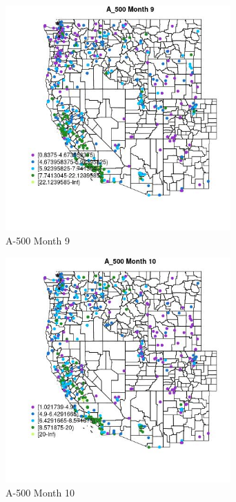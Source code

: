 \begin{figure} 
\centering  
\includegraphics[width=0.77\textwidth]{Code_Outputs/ML_input_report_ML_input_PM25_Step5_part_d_de_duplicated_aves_ML_input_MapObsMo9A_500.jpg} 
\caption{\label{fig:ML_input_report_ML_input_PM25_Step5_part_d_de_duplicated_aves_ML_inputMapObsMo9A_500}A-500 Month 9} 
\end{figure} 
 

\begin{figure} 
\centering  
\includegraphics[width=0.77\textwidth]{Code_Outputs/ML_input_report_ML_input_PM25_Step5_part_d_de_duplicated_aves_ML_input_MapObsMo10A_500.jpg} 
\caption{\label{fig:ML_input_report_ML_input_PM25_Step5_part_d_de_duplicated_aves_ML_inputMapObsMo10A_500}A-500 Month 10} 
\end{figure} 
 

